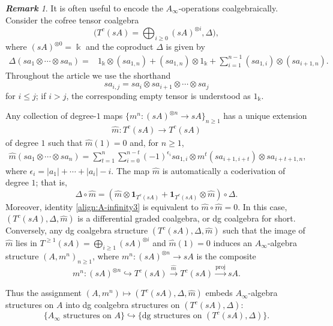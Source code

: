 \documentclass[a4paper, 11pt]{amsart}
\theoremstyle{definition}
\theoremstyle{remark}
\newtheorem{rem}[thm]{\bf Remark}
\numberwithin{equation}{section}
\begin{document}
\begin{rem}\label{rem:cofreereformation}
It is often useful to encode the $A_\infty$-operations coalgebraically. Consider the cofree tensor coalgebra
\[
\bigg(T^c(sA)=\bigoplus_{i\geq 0}(sA)^{\otimes i},\Delta\bigg),
\]
where $(sA)^{\otimes 0}=\Bbbk$ and the coproduct $\Delta$ is given by
\begin{align*}
\Delta(sa_1\otimes \dotsb \otimes sa_n) =& 1_\Bbbk \otimes (sa_{1,n})+ (sa_{1,n})\otimes 1_\Bbbk + \sum_{i=1}^{n-1} (sa_{1,i}) \otimes (sa_{i+1,n}).
\end{align*}
Throughout the article we use the shorthand
\[
sa_{i,j}=sa_i\otimes sa_{i+1}\otimes\dotsb\otimes sa_j
\]
for $i\leq j$; if $i>j$, the corresponding empty tensor is understood as $1_\Bbbk$.

Any collection of degree-$1$ maps $\{m^n\colon (sA)^{\otimes n}\to sA\}_{n\geq 1}$ has a unique extension
\begin{align}
\widehat m \colon T^c (sA) \to T^c (sA)
\end{align}
of degree $1$ such that $\widehat m(1)=0$ and, for $n\geq 1$,
\begin{align}\label{align:widehatm}
\widehat m (sa_1 \otimes \dotsb \otimes sa_n) = \sum_{t=1}^n\sum_{i=0}^{n-t} (-1)^{\epsilon_i} sa_{1,i} \otimes m^t(sa_{i+1, i+t}) \otimes sa_{i+t+1, n},
\end{align}
where $\epsilon_i=|a_1|+\dotsb+|a_i|-i$. The map $\widehat m$ is automatically a coderivation of degree $1$; that is,
\[
\Delta\circ \widehat m=(\widehat m\otimes \mathbf 1_{T^c(sA)}+\mathbf 1_{T^c(sA)}\otimes \widehat m)\circ \Delta.
\]
Moreover, identity \eqref{align:A-infinity3} is equivalent to $\widehat m\circ \widehat m=0$.
In this case, $(T^c(sA),\Delta,\widehat m)$ is a differential graded coalgebra, or dg coalgebra for short. Conversely, any dg coalgebra structure $(T^c(sA),\Delta,\widehat m)$ such that the image of $\widehat m$ lies in $T^{\geq 1}(sA)=\bigoplus_{i\geq 1}(sA)^{\otimes i}$ and $\widehat m(1)=0$ induces an $A_\infty$-algebra structure $(A,m^n)_{n\geq 1}$, where $m^n\colon (sA)^{\otimes n}\to sA$ is the composite
\[
m^n \colon (sA)^{\otimes n} \hookrightarrow T^c(sA) \xrightarrow{\widehat m} T^c(sA) \xrightarrow{\mathrm{proj}} sA.
\]


Thus the assignment $(A,m^n)\mapsto (T^c(sA),\Delta,\widehat m)$ embeds $A_\infty$-algebra structures on $A$ into dg coalgebra structures on $(T^c(sA),\Delta)$:
\[
\{\text{$A_\infty$ structures on $A$}\} \hookrightarrow \{\text{dg structures on $(T^c(sA), \Delta)$}\}.
\]

\end{rem}
\end{document}
